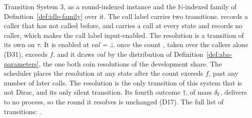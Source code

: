 \begin{definition}
  \label{def:aba-wcc-spec}
  \leanok
  Transition System 3, as a round-indexed instance and the $\mathbb{N}$-indexed family of Definition~\ref{def:idle-family} over it.
  The call label carries two transitions.
   records a caller that has not called before, and  carries a call at every state and records no caller, which makes the call label input-enabled.
  The resolution  is a transition of its own on $\tau$.
  It is enabled at $val = \bot$ once the count , taken over the callers alone (D31), exceeds $f$, and it draws $val$ by the distribution of Definition~\ref{def:aba-parameters}, the one both coin resolutions of the development share.
  The scheduler places the resolution at any state after the count exceeds $f$, past any number of later calls.
  The resolution is the only transition of this system that is not Dirac, and its only silent transition.
  Its fourth outcome $\dagger$, of mass $\delta_{\mathrm{f}}$, delivers to no process, so the round it resolves is unchanged (D17).
  The full list of transitions: .
\end{definition}
